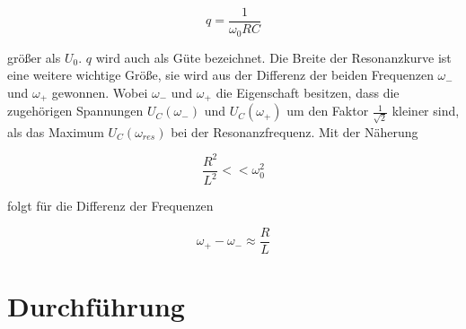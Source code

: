 \begin{equation}
  q = \frac{1}{\omega_0 RC}
\end{equation}

 größer als $U_0$. $q$ wird auch als Güte bezeichnet. Die Breite der Resonanzkurve ist eine weitere wichtige Größe,
 sie wird aus der Differenz der beiden Frequenzen $\omega_-$ und $\omega_+$ gewonnen. Wobei $\omega_-$ und $\omega_+$
 die Eigenschaft besitzen, dass die zugehörigen Spannungen $U_C(\omega_-)$ und $U_C(\omega_+)$  um den Faktor
 $\frac{1}{\sqrt{2}}$ kleiner sind, als das Maximum $U_C(\omega_{res})$ bei der Resonanzfrequenz.
 Mit der Näherung

 \begin{equation*}
   \frac{R^2}{L^2} << \omega_0^2
 \end{equation*}

folgt für die Differenz der Frequenzen

\begin{equation}
\omega_+ - \omega_- \approx \frac{R}{L}
\end{equation}

 \section{Durchführung}

